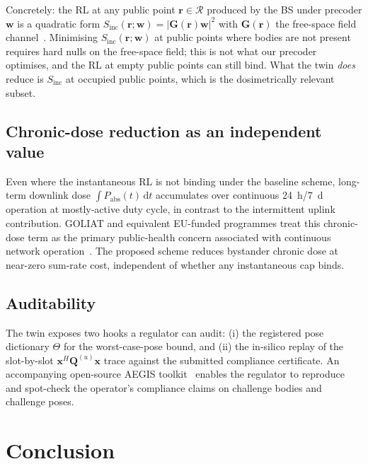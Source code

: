 \documentclass[journal,twoside,onecolumn]{IEEEtran}
\theoremstyle{definition}
\newcommand{\rr}{\mathbf{r}}
\newcommand{\xx}{\mathbf{x}}
\newcommand{\ww}{\mathbf{w}}
\newcommand{\Sinc}{S_{\mathrm{inc}}}
\newcommand{\Pabs}{P_{\mathrm{abs}}}
\newcommand{\Q}{\mathbf{Q}}
\begin{document}
Concretely: the RL at any public point $\rr\in\mathcal{R}$
produced by the BS under precoder $\ww$ is a quadratic form
$\Sinc(\rr;\ww)=|\mathbf{G}(\rr)\ww|^2$ with $\mathbf{G}(\rr)$ the
free-space field channel~\cite{SystemFormalism}. Minimising
$\Sinc(\rr;\ww)$ at public points where bodies are not present
requires hard nulls on the free-space field; this is not what our
precoder optimises, and the RL at empty public points can still
bind. What the twin \emph{does} reduce is $\Sinc$ at occupied
public points, which is the dosimetrically relevant subset.

\subsection{Chronic-dose reduction as an independent value}

Even where the instantaneous RL is not binding under the baseline
scheme, long-term downlink dose $\int \Pabs(t)\,\mathrm{d}t$
accumulates over continuous \SI{24}{h}/\SI{7}{d} operation at
mostly-active duty cycle, in contrast to the intermittent uplink
contribution. GOLIAT and equivalent EU-funded programmes treat
this chronic-dose term as the primary public-health concern
associated with continuous network operation~\cite{GOLIAT}. The
proposed scheme reduces bystander chronic dose at near-zero
sum-rate cost, independent of whether any instantaneous cap binds.

\subsection{Auditability}

The twin exposes two hooks a regulator can audit: (i) the
registered pose dictionary $\Theta$ for the worst-case-pose bound,
and (ii) the in-silico replay of the slot-by-slot
$\xx^H\Q^{(u)}\xx$ trace against the submitted compliance
certificate. An accompanying open-source AEGIS
toolkit~\cite{AEGIS} enables the regulator to reproduce and spot-check
the operator's compliance claims on challenge bodies and challenge
poses.

\section{Conclusion}\label{sec:conclusion}
\end{document}
